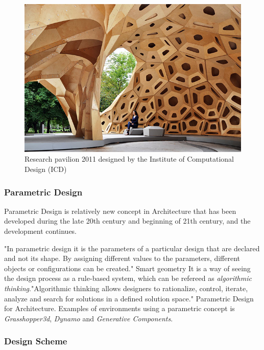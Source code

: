 \begin{figure}[H]
\centering
\includegraphics[width=0.9\linewidth ]{figure/Introduction/ICD.jpg}
\caption{Research pavilion 2011 designed by the Institute of Computational Design (ICD) }
\end{figure}

\subsubsection{Parametric Design}
Parametric Design is relatively new concept in Architecture that has been developed during the late 20th century and beginning of 21th century, and the development continues. 

"In parametric design it is the parameters of a particular design that are declared and not its shape. By assigning different values to the parameters, different objects or configurations can be created." Smart geometry
It is a way of seeing the design process as a rule-based system, which can be refereed as \textit{algorithmic thinking}."Algorithmic thinking allows designers  to rationalize, control, iterate, analyze and search for solutions in a defined solution space." Parametric Design for Architecture.
Examples of environments using a parametric concept is \textit{Grasshopper3d}, \textit{Dynamo} and 
\textit{Generative Components}.

\subsubsection{Design Scheme} \label{dScheme}

